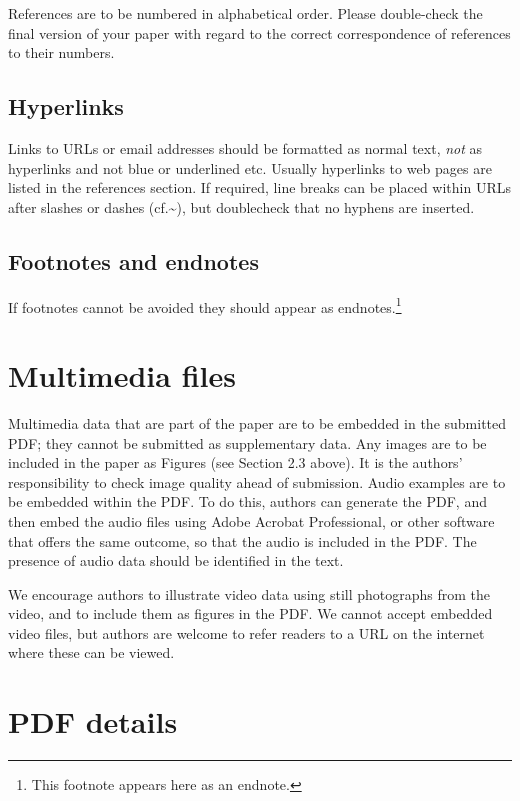 \documentclass[
  a4paper,
  11pt,
  twocolumn]{article}
\begin{document}
References are to be numbered in alphabetical order. Please double-check
the final version of your paper with regard to the correct
correspondence of references to their numbers.

\subsection{Hyperlinks}

Links to URLs or email addresses should be formatted as normal text,
\textit{not} as hyperlinks and not blue or underlined etc. Usually
hyperlinks to web pages are listed in the references section. If
required, line breaks can be placed within URLs after slashes or dashes
(cf.\textasciitilde{}\cite{IPA-SIL,IPA-KEYBOARD}), but doublecheck that
no hyphens are inserted.

\subsection{Footnotes and endnotes}

If footnotes cannot be avoided they should appear as
endnotes.\footnote{This footnote appears here as an endnote.}

\section{Multimedia files}

Multimedia data that are part of the paper are to be embedded in the
submitted PDF; they cannot be submitted as supplementary data. Any
images are to be included in the paper as Figures (see Section 2.3
above). It is the authors' responsibility to check image quality ahead
of submission. Audio examples are to be embedded within the PDF. To do
this, authors can generate the PDF, and then embed the audio files using
Adobe Acrobat Professional, or other software that offers the same
outcome, so that the audio is included in the PDF. The presence of audio
data should be identified in the text.

We encourage authors to illustrate video data using still photographs
from the video, and to include them as figures in the PDF. We cannot
accept embedded video files, but authors are welcome to refer readers to
a URL on the internet where these can be viewed.

\section{PDF details}
\end{document}
